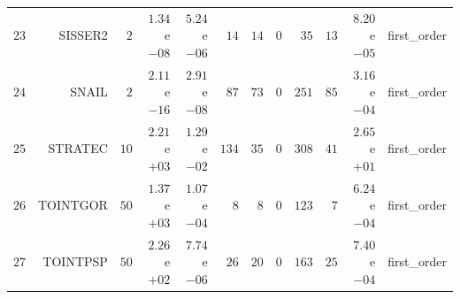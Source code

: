 \begin{longtable}{rrrrrrrrrrrr}
  \(    23\) & SISSER2 & \(     2\) & \( 1.34\)e\(-08\) & \( 5.24\)e\(-06\) & \(    14\) & \(    14\) & \(     0\) & \(    35\) & \(    13\) & \( 8.20\)e\(-05\) & first\_order \\
  \(    24\) & SNAIL & \(     2\) & \( 2.11\)e\(-16\) & \( 2.91\)e\(-08\) & \(    87\) & \(    73\) & \(     0\) & \(   251\) & \(    85\) & \( 3.16\)e\(-04\) & first\_order \\
  \(    25\) & STRATEC & \(    10\) & \( 2.21\)e\(+03\) & \( 1.29\)e\(-02\) & \(   134\) & \(    35\) & \(     0\) & \(   308\) & \(    41\) & \( 2.65\)e\(+01\) & first\_order \\
  \(    26\) & TOINTGOR & \(    50\) & \( 1.37\)e\(+03\) & \( 1.07\)e\(-04\) & \(     8\) & \(     8\) & \(     0\) & \(   123\) & \(     7\) & \( 6.24\)e\(-04\) & first\_order \\
  \(    27\) & TOINTPSP & \(    50\) & \( 2.26\)e\(+02\) & \( 7.74\)e\(-06\) & \(    26\) & \(    20\) & \(     0\) & \(   163\) & \(    25\) & \( 7.40\)e\(-04\) & first\_order \\\hline
\end{longtable}
